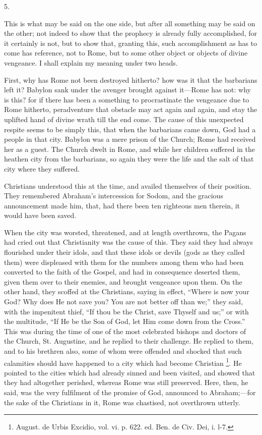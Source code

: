 5.

This is what may be said on the one side, but after all something
may be said on the other; not indeed to show that the prophecy is
already fully accomplished, for it certainly is not, but to show that,
granting this, such accomplishment as has to come has reference, not
to Rome, but to some other object or objects of divine vengeance. I
shall explain my meaning under two heads.

First, why has Rome not been destroyed hitherto? how was it that
the barbarians left it? Babylon sank under the avenger brought against
it—Rome has not: why is this? for if there has been a something to
procrastinate the vengeance due to Rome hitherto, peradventure that
obstacle may act again and again, and stay the uplifted hand of divine
wrath till the end come. The cause of this unexpected respite seems to
be simply this, that when the barbarians came down, God had a people
in that city. Babylon was a mere prison of the Church; Rome had
received her as a guest. The Church dwelt in Rome, and while her
children suffered in the heathen city from the barbarians, so again
they were the life and the salt of that city where they suffered.

Christians understood this at the time, and availed themselves of
their position. They remembered Abraham's intercession for Sodom, and
the gracious announcement made him, that, had there been ten righteous
men therein, it would have been saved.

When the city was worsted, threatened, and at length overthrown,
the Pagans had cried out that Christianity was the cause of this. They
said they had always flourished under their idols, and that these
idols or devils (gods as they called them) were displeased with them
for the numbers among them who had been converted to the faith of the
Gospel, and had in consequence deserted them, given them over to their
enemies, and brought vengeance upon them. On the other hand, they
scoffed at the Christians, saying in effect, ``Where is now your
God? Why does He not save you? You are not better off than we;''
they said, with the impenitent thief, ``If thou be the Christ,
save Thyself and us;'' or with the multitude, ``If He be the
Son of God, let Him come down from the Cross.'' This was during
the time of one of the most celebrated bishops and doctors of the
Church, St. Augustine, and he replied to their challenge. He replied
to them, and to his brethren also, some of whom were offended and
shocked that such calamities should have happened to a city which had
become Christian \footnote{August. de Urbis Excidio, vol. vi. p. 622.
ed. Ben. de Civ. Dei, i. l-7.}. He
pointed to the cities which had already sinned and been visited, and
showed that they had altogether perished, whereas Rome was still
preserved. Here, then, he said, was the very fulfilment of the promise
of God, announced to Abraham;—for the sake of the Christians in it,
Rome was chastised, not overthrown utterly.

